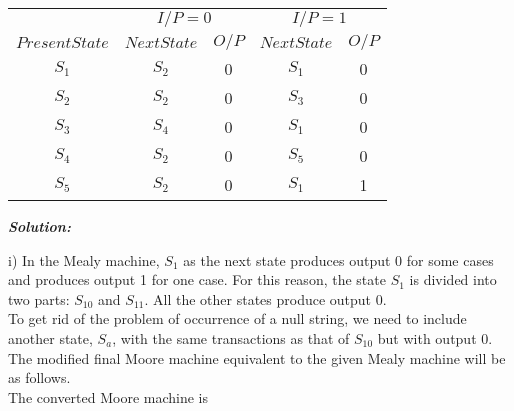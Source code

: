 \documentclass{article}
\begin{document}
\begin{center}
\begin{tabular}{ccccc}
 \hline

 \hline

 \hline

 \hline
 &  \multicolumn{2}{c}{$I/P = 0$ } &  \multicolumn{2}{c}{$I/P = 1$}  \\
  \cline{2-3}                         \cline{4-5}
 $Present State$ &   $Next State$  & $O/P$ &  $Next State$  & $O/P$\\
\hline
$S_1$ & $S_2$ & 0 & $S_1$ &0\\
$S_2$ & $S_2$ & 0 & $S_3$ &0\\
$S_3$ & $S_4$ & 0 & $S_1$ &0\\
$S_4$ & $S_2$ & 0 & $S_5$ &0\\
$S_5$ & $S_2$ & 0 & $S_1$ &1\\

 \hline

 \hline

 \hline

 \hline
\end{tabular}
\end{center}

\vspace*{0.3cm}

\emph{
\textbf{Solution:}\\
}

i) In the Mealy machine, $S_1$ as the next state produces output 0 for some cases and produces
output 1 for one case. For this reason, the state $S_1$ is divided into two parts: $S_10$ and $S_11$. All the
other states produce output 0.\\
To get rid of the problem of occurrence of a null string, we need to include another state, $S_a$,
with the same transactions as that of $S_10$ but with output 0.\\
\hspace*{0.5cm} The modified final Moore machine equivalent to the given Mealy machine will be as follows.\\

\hspace*{0.5cm}The converted Moore machine is\\
\end{document}
